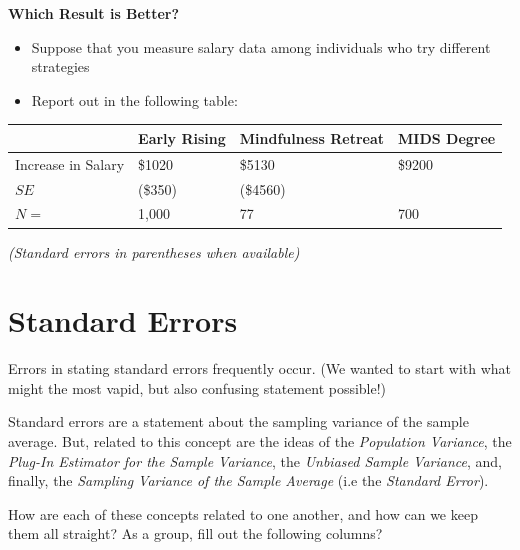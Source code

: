 \documentclass[
]{book}
\providecommand{\tightlist}{%
  \setlength{\itemsep}{0pt}\setlength{\parskip}{0pt}}
\theoremstyle{definition}
\theoremstyle{definition}
\theoremstyle{definition}
\theoremstyle{definition}
\theoremstyle{remark}
\begin{document}
\textbf{Which Result is Better?}

\begin{itemize}
\tightlist
\item
  Suppose that you measure salary data among individuals who try different strategies
\item
  Report out in the following table:
\end{itemize}

\begin{longtable}[]{@{}llll@{}}
\toprule
& Early Rising & Mindfulness Retreat & MIDS Degree \\
\midrule
\endhead
Increase in Salary & \$1020 & \$5130 & \$9200 \\
\(SE\) & (\$350) & (\$4560) & \\
\(N =\) & 1,000 & 77 & 700 \\
\bottomrule
\end{longtable}

\emph{(Standard errors in parentheses when available)}

\hypertarget{standard-errors}{%
\section{Standard Errors}\label{standard-errors}}

Errors in stating standard errors frequently occur. (We wanted to start with what might the most vapid, but also confusing statement possible!)

Standard errors are a statement about the sampling variance of the sample average. But, related to this concept are the ideas of the \emph{Population Variance}, the \emph{Plug-In Estimator for the Sample Variance}, the \emph{Unbiased Sample Variance}, and, finally, the \emph{Sampling Variance of the Sample Average} (i.e the \emph{Standard Error}).

How are each of these concepts related to one another, and how can we keep them all straight? As a group, fill out the following columns?
\end{document}
